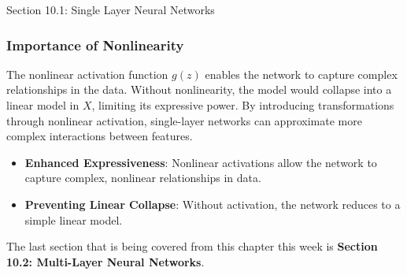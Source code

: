 \begin{notes}{Section 10.1: Single Layer Neural Networks}
    \subsubsection*{Importance of Nonlinearity}
    
    The nonlinear activation function $g(z)$ enables the network to capture complex relationships in the data. Without nonlinearity, the model would collapse into a linear model in $X$, limiting its 
    expressive power. By introducing transformations through nonlinear activation, single-layer networks can approximate more complex interactions between features.
    
    \begin{highlight}
        \begin{itemize}
            \item \textbf{Enhanced Expressiveness}: Nonlinear activations allow the network to capture complex, nonlinear relationships in data.
            \item \textbf{Preventing Linear Collapse}: Without activation, the network reduces to a simple linear model.
        \end{itemize}
    \end{highlight}
\end{notes}

The last section that is being covered from this chapter this week is \textbf{Section 10.2: Multi-Layer Neural Networks}.

